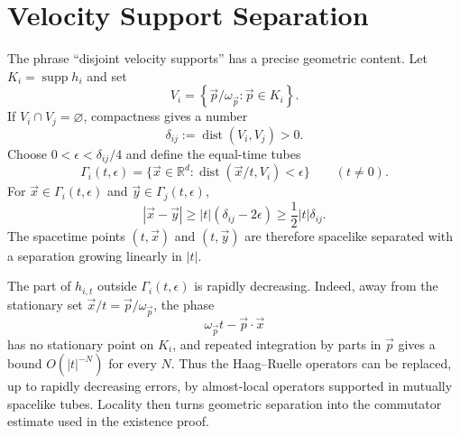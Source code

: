 \begin{center}
\end{center}

\section{Velocity Support Separation}

The phrase ``disjoint velocity supports'' has a precise geometric content.
Let \(K_i=\operatorname{supp}h_i\) and set
\[
  V_i=\left\{\vec p/\omega_{\vec p}:\vec p\in K_i\right\}.
\]
If \(V_i\cap V_j=\varnothing\), compactness gives a number
\[
  \delta_{ij}:=\operatorname{dist}(V_i,V_j)>0 .
\]
Choose \(0<\epsilon<\delta_{ij}/4\) and define the equal-time tubes
\[
  \Gamma_i(t,\epsilon)
  =
  \{\vec x\in\mathbb R^d:\operatorname{dist}(\vec x/t,V_i)<\epsilon\}
  \qquad (t\ne0).
\]
For \(\vec x\in \Gamma_i(t,\epsilon)\) and
\(\vec y\in\Gamma_j(t,\epsilon)\),
\[
  |\vec x-\vec y|
  \ge |t|(\delta_{ij}-2\epsilon)
  \ge \frac12|t|\delta_{ij}.
\]
The spacetime points \((t,\vec x)\) and \((t,\vec y)\) are therefore
spacelike separated with a separation growing linearly in \(|t|\).

The part of \(h_{i,t}\) outside \(\Gamma_i(t,\epsilon)\) is rapidly
decreasing.  Indeed, away from the stationary set
\(\vec x/t=\vec p/\omega_{\vec p}\), the phase
\[
  \omega_{\vec p}t-\vec p\cdot\vec x
\]
has no stationary point on \(K_i\), and repeated integration by parts in
\(\vec p\) gives a bound \(O(|t|^{-N})\) for every \(N\).  Thus the
Haag--Ruelle operators can be replaced, up to rapidly decreasing errors, by
almost-local operators supported in mutually spacelike tubes.  Locality then
turns geometric separation into the commutator estimate used in the
existence proof.

